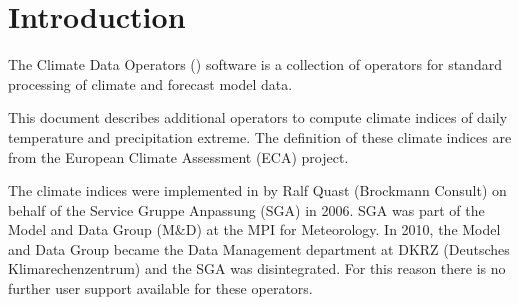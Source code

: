 \chapter{Introduction}

The Climate Data Operators ({\CDO}) software is a collection of operators
for standard processing of climate and forecast model data.

This document describes additional {\CDO} operators to compute climate indices
of daily temperature and precipitation extreme.
The definition of these climate indices are from the European Climate
Assessment (ECA) project.

The climate indices were implemented in {\CDO} by Ralf Quast
(Brockmann Consult) on behalf of the Service Gruppe Anpassung (SGA) in 2006.
SGA was part of the Model and Data Group (M\&D) at the MPI for Meteorology.
In 2010, the Model and Data Group became the Data Management
department at DKRZ (Deutsches Klimarechenzentrum) and the SGA was
disintegrated. 
For this reason there is no further user support available for these {\CDO} operators.
